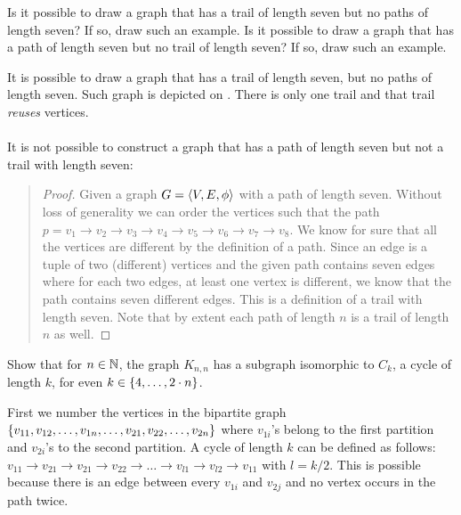\documentclass{article}
\begin{document}
\begin{exercise}
Is it possible to draw a graph that has a trail of length seven but no paths of length seven? If so, draw such an example. Is it possible to draw a graph that has a path of length seven but no trail of length seven? If so, draw such an example.
\begin{answer}
It is possible to draw a graph that has a trail of length seven, but no paths of length seven. Such graph is depicted on . There is only one trail and that trail \emph{reuses} vertices.
\paragraph{}
It is not possible to construct a graph that has a path of length seven but not a trail with length seven:
\begin{quote}\begin{proof}
Given a graph $G=\left\langle V,E,\phi \right\rangle$ with a path of length seven. Without loss of generality we can order the vertices such that the path $p=v_1\rightarrow v_2\rightarrow v_3\rightarrow v_4\rightarrow v_5\rightarrow v_6\rightarrow v_7\rightarrow v_8$. We know for sure that all the vertices are different by the definition of a path. Since an edge is a tuple of two (different) vertices and the given path contains seven edges where for each two edges, at least one vertex is different, we know that the path contains seven different edges. This is a definition of a trail with length seven. Note that by extent each path of length $n$ is a trail of length $n$ as well.
\end{proof}\end{quote}
\end{answer}
\end{exercise}

\begin{exercise}
Show that for $n\in\mathbb{N}$, the graph $K_{n,n}$ has a subgraph isomorphic to $C_k$, a cycle of length $k$, for even $k\in\left\{ 4,\ldots,2\cdot n \right\}$.
\begin{answer}
First we number the vertices in the bipartite graph $\left\{ v_{11},v_{12},\ldots,v_{1n},\ldots,v_{21},v_{22},\ldots,v_{2n} \right\}$ where $v_{1i}$'s belong to the first partition and $v_{2i}$'s to the second partition. A cycle of length $k$ can be defined as follows: $v_{11}\rightarrow v_{21}\rightarrow v_{21}\rightarrow v_{22}\rightarrow\ldots\rightarrow v_{l1}\rightarrow v_{l2}\rightarrow v_{11}$ with $l=k/2$. This is possible because there is an edge between every $v_{1i}$ and $v_{2j}$ and no vertex occurs in the path twice.
\end{answer}
\end{exercise}
\end{document}
